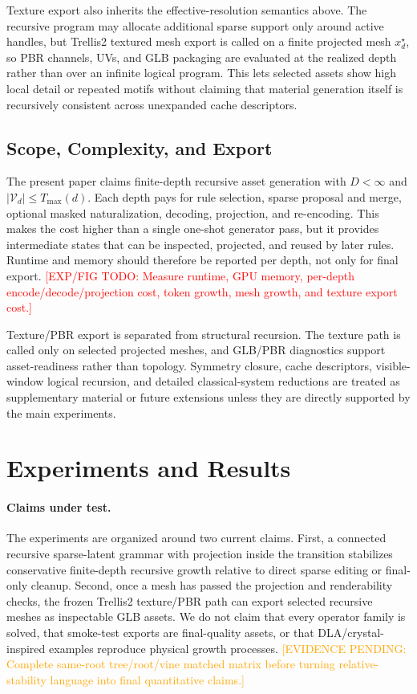 \documentclass[sigconf,anonymous,review]{acmart}
\providecommand{\EvidencePending}[1]{\textcolor{orange}{[EVIDENCE PENDING: #1]}}
\providecommand{\ExpFigTODO}[1]{\textcolor{red}{[EXP/FIG TODO: #1]}}
\begin{document}
Texture export also inherits the effective-resolution semantics above. The recursive program may allocate additional sparse support only around active handles, but Trellis2 textured mesh export is called on a finite projected mesh $x_d^\star$, so PBR channels, UVs, and GLB packaging are evaluated at the realized depth rather than over an infinite logical program. This lets selected assets show high local detail or repeated motifs without claiming that material generation itself is recursively consistent across unexpanded cache descriptors.

\subsection{Scope, Complexity, and Export}
The present paper claims finite-depth recursive asset generation with $D<\infty$ and $|\mathcal V_d|\leq T_{\max}(d)$. Each depth pays for rule selection, sparse proposal and merge, optional masked naturalization, decoding, projection, and re-encoding. This makes the cost higher than a single one-shot generator pass, but it provides intermediate states that can be inspected, projected, and reused by later rules. Runtime and memory should therefore be reported per depth, not only for final export. \ExpFigTODO{Measure runtime, GPU memory, per-depth encode/decode/projection cost, token growth, mesh growth, and texture export cost.}

Texture/PBR export is separated from structural recursion. The texture path is called only on selected projected meshes, and GLB/PBR diagnostics support asset-readiness rather than topology. Symmetry closure, cache descriptors, visible-window logical recursion, and detailed classical-system reductions are treated as supplementary material or future extensions unless they are directly supported by the main experiments.

\section{Experiments and Results}

\paragraph{Claims under test.}
The experiments are organized around two current claims. First, a connected recursive sparse-latent grammar with projection inside the transition stabilizes conservative finite-depth recursive growth relative to direct sparse editing or final-only cleanup. Second, once a mesh has passed the projection and renderability checks, the frozen Trellis2 texture/PBR path can export selected recursive meshes as inspectable GLB assets. We do not claim that every operator family is solved, that smoke-test exports are final-quality assets, or that DLA/crystal-inspired examples reproduce physical growth processes. \EvidencePending{Complete same-root tree/root/vine matched matrix before turning relative-stability language into final quantitative claims.}
\end{document}
